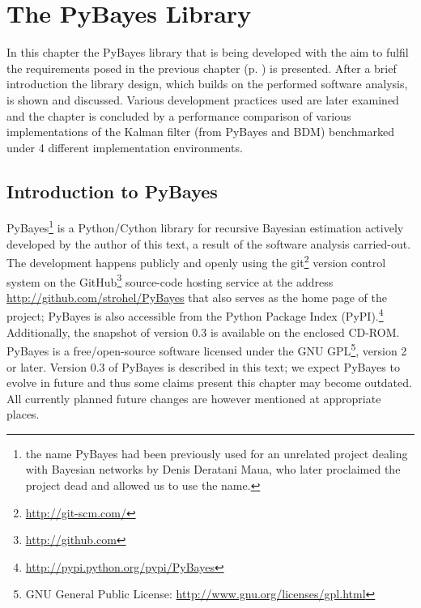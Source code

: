 \chapter{The PyBayes Library}

In this chapter the PyBayes library that is being developed with the aim to fulfil the requirements
posed in the previous chapter (p. \pageref{sec:Requirements}) is presented. After a brief introduction
the library design, which builds on the performed software analysis, is shown and discussed.
Various development practices used are later examined and the chapter is concluded by a performance
comparison of various implementations of the Kalman filter (from PyBayes and BDM) benchmarked under
4 different implementation environments.

\section{Introduction to PyBayes}

PyBayes\footnote{the name PyBayes had been previously used for an unrelated project dealing with
Bayesian networks by Denis Deratani Maua, who later proclaimed the project dead and allowed us
to use the name.}
is a Python/Cython library for recursive Bayesian estimation actively developed by the
author of this text, a result of the software analysis carried-out. The development happens publicly
and openly using the git\footnote{\url{http://git-scm.com/}} version control system on the
GitHub\footnote{\url{http://github.com}} source-code hosting service at the address
\url{http://github.com/strohel/PyBayes} that also serves as the home page of the project; PyBayes is
also accessible from the Python Package Index (PyPI).\footnote{\url{http://pypi.python.org/pypi/PyBayes}}
\ifattachements
	Additionally, the snapshot of version 0.3 is available on the enclosed CD-ROM.
\fi
PyBayes is a free/open-source software licensed under the GNU GPL\footnote{GNU General Public
License: \url{http://www.gnu.org/licenses/gpl.html}}, version 2 or later. Version 0.3 of PyBayes is
described in this text; we expect PyBayes to evolve in future and thus some claims present this
chapter may become outdated. All currently planned future changes are however mentioned at
appropriate places.

